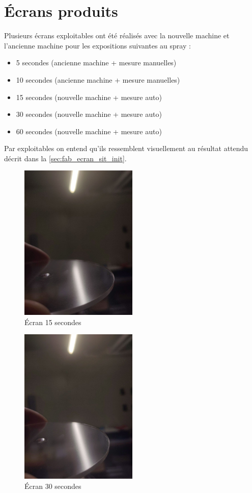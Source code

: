 \section{Écrans produits}
Plusieurs écrans exploitables ont été réalisés avec la nouvelle machine et l'ancienne machine pour les expositions suivantes au spray :
\begin{itemize}
  \item 5 secondes (ancienne machine + mesure manuelles)
  \item 10 secondes (ancienne machine + mesure manuelles)
  \item 15 secondes (nouvelle machine + mesure auto)
  \item 30 secondes (nouvelle machine + mesure auto)
  \item 60 secondes (nouvelle machine + mesure auto)
\end{itemize}
Par exploitables on entend qu'ils ressemblent visuellement au résultat attendu décrit dans la \autoref{sec:fab_ecran_sit_init}.
\begin{figure}[H]
  \centering
  \includegraphics[width = 0.5\textwidth]{assets/figures/mesures/15_sec.jpeg}
  \caption{Écran 15 secondes}
\end{figure}

\begin{figure}[H]
  \centering
  \includegraphics[width = 0.5\textwidth]{assets/figures/mesures/30_sec.jpeg}
  \caption{Écran 30 secondes}
\end{figure}

